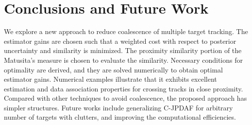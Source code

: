 \documentclass[letterpaper, 10pt, conference]{ieeeconf}
\begin{document}


\section{Conclusions and Future Work}
\label{ConclusionFutureWork}
We explore a new approach to reduce coalescence of multiple target tracking. The estimator gains are chosen such that a weighted cost with respect to posterior uncertainty and similarity is minimized. The proximity similarity portion of the Matusita's measure is chosen to evaluate the similarity. Necessary conditions for optimality are derived, and they are solved numerically to obtain optimal estimator gains. Numerical examples illustrate that it exhibits excellent estimation and data association properties for crossing tracks in close proximity. Compared with other techniques to avoid coalescence, the proposed approach has simpler structures. Future works include generalizing C-JPDAF for arbitrary number of targets with clutters, and improving the computational efficiencies. 

\end{document}
